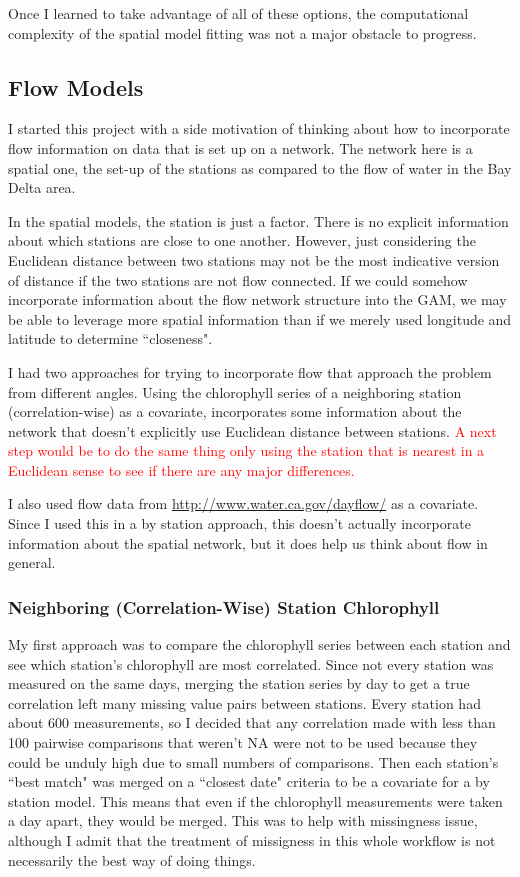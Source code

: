 \documentclass[12pt]{amsart}
\begin{document}
Once I learned to take advantage of all of these options, the computational complexity of the spatial model fitting was not a major obstacle to progress.

\subsection{Flow Models}

I started this project with a side motivation of thinking about how to incorporate flow information on data that is set up on a network. The network here is a spatial one, the set-up of the stations as compared to the flow of water in the Bay Delta area.

In the spatial models, the station is just a factor. There is no explicit information about which stations are close to one another. However, just considering the Euclidean distance between two stations may not be the most indicative version of distance if the two stations are not flow connected. If we could somehow incorporate information about the flow network structure into the GAM, we may be able to leverage more spatial information than if we merely used longitude and latitude to determine ``closeness".

I had two approaches for trying to incorporate flow that approach the problem from different angles. Using the chlorophyll series of a neighboring station (correlation-wise) as a covariate, incorporates some information about the network that doesn't explicitly use Euclidean distance between stations. \textcolor{red}{A next step would be to do the same thing only using the station that is nearest in a Euclidean sense to see if there are any major differences.}

I also used flow data from \url{http://www.water.ca.gov/dayflow/} as a covariate. Since I used this in a by station approach, this doesn't actually incorporate information about the spatial network, but it does help us think about flow in general. 



\subsubsection{Neighboring (Correlation-Wise) Station Chlorophyll}

My first approach was to compare the chlorophyll series between each station and see which station's chlorophyll are most correlated. Since not every station was measured on the same days, merging the station series by day to get a true correlation left many missing value pairs between stations. Every station had about 600 measurements, so I decided that any correlation made with less than 100 pairwise comparisons that weren't NA were not to be used because they could be unduly high due to small numbers of comparisons. Then each station's ``best match" was merged on a ``closest date" criteria to be a covariate for a by station model. This means that even if the chlorophyll measurements were taken a day apart, they would be merged. This was to help with missingness issue, although I admit that the treatment of missigness in this whole workflow is not necessarily the best way of doing things.
\end{document}
